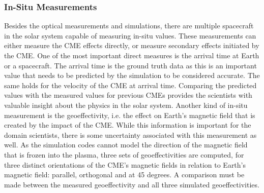 \documentclass[journal]{vgtc}                %
\begin{document}
\subsubsection{In-Situ Measurements} \label{sec:insitu}
Besides the optical measurements and simulations, there are multiple spacecraft in the solar system capable of measuring in-situ values. These measurements can either measure the CME effects directly, or measure secondary effects initiated by the CME. One of the most important direct measures is the arrival time at Earth or a spacecraft. The arrival time is the ground truth data as this is an important value that needs to be predicted by the simulation to be considered accurate. The same holds for the velocity of the CME at arrival time. Comparing the predicted values with the measured values for previous CMEs provides the scientists with valuable insight about the physics in the solar system. Another kind of in-situ measurement is the geoeffectivity, i.e. the effect on Earth's magnetic field that is created by the impact of the CME. While this information is important for the domain scientists, there is some uncertainty associated with this measurement as well. As the simulation codes cannot model the direction of the magnetic field that is frozen into the plasma, three sets of geoeffectivities are computed, for three distinct orientations of the CME's magnetic fields in relation to Earth's magnetic field:  parallel, orthogonal and at 45 degrees. A comparison must be made between the measured geoeffectivity and all three simulated geoeffectivities.
\end{document}

